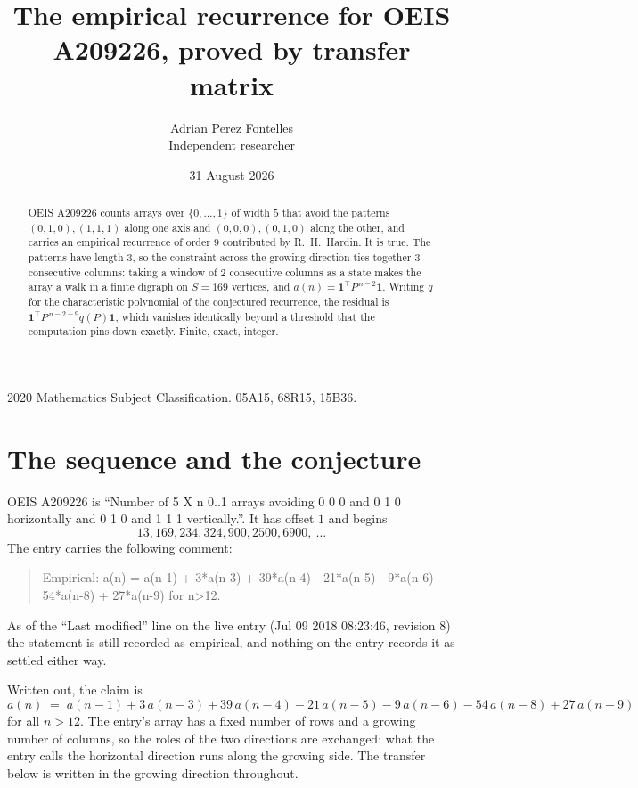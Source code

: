 \documentclass[11pt,a4paper]{article}
\title{The empirical recurrence for OEIS A209226, proved by transfer matrix}
\author{Adrian Perez Fontelles\\ \small Independent researcher}
\date{31 August 2026}
\theoremstyle{plain}
\theoremstyle{definition}
\begin{document}
\maketitle

\begin{abstract}
OEIS A209226 counts arrays over $\{0,\dots,1\}$ of width $5$ that avoid the patterns
$(0,1,0), (1,1,1)$ along one axis and $(0,0,0), (0,1,0)$ along the other, and carries an empirical recurrence of
order $9$ contributed by R.~H.~Hardin. It is true. The patterns have length $3$, so
the constraint across the growing direction ties together $3$ consecutive columns: taking a
window of $2$ consecutive columns as a state makes the array a walk in a finite digraph
on $S=169$ vertices, and $a(n)=\mathbf{1}^{\!\top}P^{\,n-2}\mathbf{1}$. Writing $q$
for the characteristic polynomial of the conjectured recurrence, the residual is
$\mathbf{1}^{\!\top}P^{\,n-2-9}q(P)\mathbf{1}$, which vanishes identically
beyond a threshold that the computation pins down exactly. Finite, exact, integer.
\end{abstract}

\noindent\small 2020 Mathematics Subject Classification. 05A15, 68R15, 15B36.\normalsize

\section{The sequence and the conjecture}

OEIS A209226 is ``Number of 5 X n 0..1 arrays avoiding 0 0 0 and 0 1 0 horizontally and 0 1 0 and 1 1 1 vertically.''. It has offset
$1$ and begins
\[
13, 169, 234, 324, 900, 2500, 6900,\ \dots
\]
The entry carries the following comment:
\begin{quote}\small
Empirical: a(n) = a(n-1) + 3*a(n-3) + 39*a(n-4) - 21*a(n-5) - 9*a(n-6) - 54*a(n-8) + 27*a(n-9) for n>12.
\end{quote}
As of the ``Last modified'' line on the live entry (Jul 09 2018 08:23:46, revision
8) the statement is still recorded as empirical, and nothing on the entry
records it as settled either way.

Written out, the claim is
\begin{equation}\label{eq:conj}
a(n)\;=\;a(n-1) + 3\,a(n-3) + 39\,a(n-4) - 21\,a(n-5) - 9\,a(n-6) - 54\,a(n-8) + 27\,a(n-9)
\end{equation}
for all $n>12$. The entry's array has a fixed number of rows and a growing number of
columns, so the roles of the two directions are exchanged: what the entry calls the
horizontal direction runs along the growing side. The transfer below is written in the
growing direction throughout.
\end{document}
